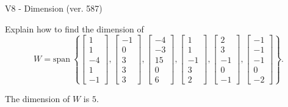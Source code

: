 \begin{exercise}
  \begin{exerciseTitle}V8 - Dimension (ver. 587)\end{exerciseTitle}
  \begin{exerciseStatement}
    Explain how to find the dimension of 
\[W=\mathrm{span}\ \left\{\left[\begin{array}{r}
1 \\
1 \\
-4 \\
1 \\
-1
\end{array}\right] , \left[\begin{array}{r}
-1 \\
0 \\
3 \\
3 \\
3
\end{array}\right] , \left[\begin{array}{r}
-4 \\
-3 \\
15 \\
0 \\
6
\end{array}\right] , \left[\begin{array}{r}
1 \\
1 \\
-1 \\
3 \\
2
\end{array}\right] , \left[\begin{array}{r}
2 \\
3 \\
-1 \\
0 \\
-1
\end{array}\right] , \left[\begin{array}{r}
-1 \\
-1 \\
-1 \\
0 \\
-2
\end{array}\right]\right\}.\]



  \end{exerciseStatement}
  \begin{exerciseAnswer}
   The dimension of \(W\) is  \(5\).
  


  \end{exerciseAnswer}
\end{exercise}